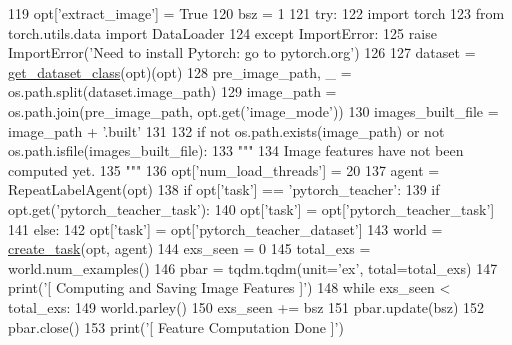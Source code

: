 \begin{DoxyCode}
119         opt[\textcolor{stringliteral}{'extract\_image'}] = \textcolor{keyword}{True}
120         bsz = 1
121         \textcolor{keywordflow}{try}:
122             \textcolor{keyword}{import} torch
123             \textcolor{keyword}{from} torch.utils.data \textcolor{keyword}{import} DataLoader
124         \textcolor{keywordflow}{except} ImportError:
125             \textcolor{keywordflow}{raise} ImportError(\textcolor{stringliteral}{'Need to install Pytorch: go to pytorch.org'})
126 
127         dataset = \hyperlink{namespaceparlai_1_1scripts_1_1extract__image__feature_a4fa5d8aef45056034f4898531a0f9967}{get\_dataset\_class}(opt)(opt)
128         pre\_image\_path, \_ = os.path.split(dataset.image\_path)
129         image\_path = os.path.join(pre\_image\_path, opt.get(\textcolor{stringliteral}{'image\_mode'}))
130         images\_built\_file = image\_path + \textcolor{stringliteral}{'.built'}
131 
132         \textcolor{keywordflow}{if} \textcolor{keywordflow}{not} os.path.exists(image\_path) \textcolor{keywordflow}{or} \textcolor{keywordflow}{not} os.path.isfile(images\_built\_file):
133             \textcolor{stringliteral}{"""}
134 \textcolor{stringliteral}{            Image features have not been computed yet.}
135 \textcolor{stringliteral}{            """}
136             opt[\textcolor{stringliteral}{'num\_load\_threads'}] = 20
137             agent = RepeatLabelAgent(opt)
138             \textcolor{keywordflow}{if} opt[\textcolor{stringliteral}{'task'}] == \textcolor{stringliteral}{'pytorch\_teacher'}:
139                 \textcolor{keywordflow}{if} opt.get(\textcolor{stringliteral}{'pytorch\_teacher\_task'}):
140                     opt[\textcolor{stringliteral}{'task'}] = opt[\textcolor{stringliteral}{'pytorch\_teacher\_task'}]
141                 \textcolor{keywordflow}{else}:
142                     opt[\textcolor{stringliteral}{'task'}] = opt[\textcolor{stringliteral}{'pytorch\_teacher\_dataset'}]
143             world = \hyperlink{namespaceparlai_1_1core_1_1worlds_a79969c7ba76d4b3c500f5bb776444dc6}{create\_task}(opt, agent)
144             exs\_seen = 0
145             total\_exs = world.num\_examples()
146             pbar = tqdm.tqdm(unit=\textcolor{stringliteral}{'ex'}, total=total\_exs)
147             print(\textcolor{stringliteral}{'[ Computing and Saving Image Features ]'})
148             \textcolor{keywordflow}{while} exs\_seen < total\_exs:
149                 world.parley()
150                 exs\_seen += bsz
151                 pbar.update(bsz)
152             pbar.close()
153             print(\textcolor{stringliteral}{'[ Feature Computation Done ]'})

\end{DoxyCode}

